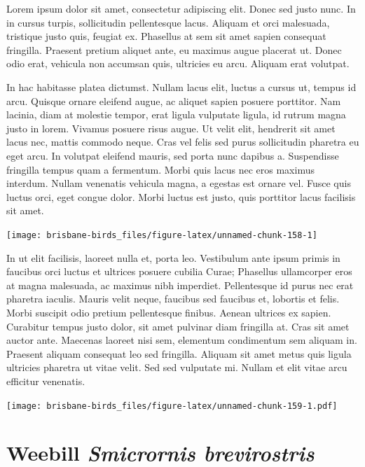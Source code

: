 \documentclass[]{book}
\let\origfigure\figure
\let\endorigfigure\endfigure
\renewenvironment{figure}[1][2] {
  \expandafter\origfigure\expandafter[H]
} {
  \endorigfigure
}
\begin{document}
Lorem ipsum dolor sit amet, consectetur adipiscing elit. Donec sed justo
nunc. In in cursus turpis, sollicitudin pellentesque lacus. Aliquam et
orci malesuada, tristique justo quis, feugiat ex. Phasellus at sem sit
amet sapien consequat fringilla. Praesent pretium aliquet ante, eu
maximus augue placerat ut. Donec odio erat, vehicula non accumsan quis,
ultricies eu arcu. Aliquam erat volutpat.

In hac habitasse platea dictumst. Nullam lacus elit, luctus a cursus ut,
tempus id arcu. Quisque ornare eleifend augue, ac aliquet sapien posuere
porttitor. Nam lacinia, diam at molestie tempor, erat ligula vulputate
ligula, id rutrum magna justo in lorem. Vivamus posuere risus augue. Ut
velit elit, hendrerit sit amet lacus nec, mattis commodo neque. Cras vel
felis sed purus sollicitudin pharetra eu eget arcu. In volutpat eleifend
mauris, sed porta nunc dapibus a. Suspendisse fringilla tempus quam a
fermentum. Morbi quis lacus nec eros maximus interdum. Nullam venenatis
vehicula magna, a egestas est ornare vel. Fusce quis luctus orci, eget
congue dolor. Morbi luctus est justo, quis porttitor lacus facilisis sit
amet.

\begin{figure}
\texttt{[image: brisbane-birds\_files/figure-latex/unnamed-chunk-158-1]} \caption{insert figure caption}\label{fig:unnamed-chunk-158}
\end{figure}

In ut elit facilisis, laoreet nulla et, porta leo. Vestibulum ante ipsum
primis in faucibus orci luctus et ultrices posuere cubilia Curae;
Phasellus ullamcorper eros at magna malesuada, ac maximus nibh
imperdiet. Pellentesque id purus nec erat pharetra iaculis. Mauris velit
neque, faucibus sed faucibus et, lobortis et felis. Morbi suscipit odio
pretium pellentesque finibus. Aenean ultrices ex sapien. Curabitur
tempus justo dolor, sit amet pulvinar diam fringilla at. Cras sit amet
auctor ante. Maecenas laoreet nisi sem, elementum condimentum sem
aliquam in. Praesent aliquam consequat leo sed fringilla. Aliquam sit
amet metus quis ligula ultricies pharetra ut vitae velit. Sed sed
vulputate mi. Nullam et elit vitae arcu efficitur venenatis.

\begin{figure}
\centering
\texttt{[image: brisbane-birds\_files/figure-latex/unnamed-chunk-159-1.pdf]}
\caption{\label{fig:unnamed-chunk-159}insert figure caption}
\end{figure}

\section{\texorpdfstring{Weebill \emph{Smicrornis
brevirostris}}{Weebill Smicrornis brevirostris}}\label{weebill-smicrornis-brevirostris}
\end{document}
